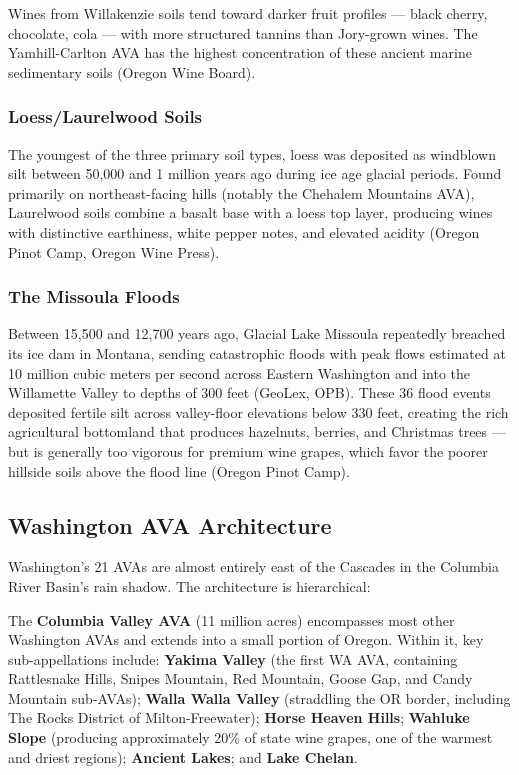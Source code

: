 \documentclass[11pt,letterpaper]{article}
\begin{document}
Wines from Willakenzie soils tend toward darker fruit profiles --- black cherry, chocolate, cola --- with more structured tannins than Jory-grown wines. The Yamhill-Carlton AVA has the highest concentration of these ancient marine sedimentary soils (Oregon Wine Board).

\subsubsection{Loess/Laurelwood Soils}

The youngest of the three primary soil types, loess was deposited as windblown silt between 50,000 and 1 million years ago during ice age glacial periods. Found primarily on northeast-facing hills (notably the Chehalem Mountains AVA), Laurelwood soils combine a basalt base with a loess top layer, producing wines with distinctive earthiness, white pepper notes, and elevated acidity (Oregon Pinot Camp, Oregon Wine Press).

\subsubsection{The Missoula Floods}

Between 15,500 and 12,700 years ago, Glacial Lake Missoula repeatedly breached its ice dam in Montana, sending catastrophic floods with peak flows estimated at 10 million cubic meters per second across Eastern Washington and into the Willamette Valley to depths of 300 feet (GeoLex, OPB). These 36 flood events deposited fertile silt across valley-floor elevations below 330 feet, creating the rich agricultural bottomland that produces hazelnuts, berries, and Christmas trees --- but is generally too vigorous for premium wine grapes, which favor the poorer hillside soils above the flood line (Oregon Pinot Camp).

\subsection{Washington AVA Architecture}

Washington's 21 AVAs are almost entirely east of the Cascades in the Columbia River Basin's rain shadow. The architecture is hierarchical:

The \textbf{Columbia Valley AVA} (11 million acres) encompasses most other Washington AVAs and extends into a small portion of Oregon. Within it, key sub-appellations include: \textbf{Yakima Valley} (the first WA AVA, containing Rattlesnake Hills, Snipes Mountain, Red Mountain, Goose Gap, and Candy Mountain sub-AVAs); \textbf{Walla Walla Valley} (straddling the OR border, including The Rocks District of Milton-Freewater); \textbf{Horse Heaven Hills}; \textbf{Wahluke Slope} (producing approximately 20\% of state wine grapes, one of the warmest and driest regions); \textbf{Ancient Lakes}; and \textbf{Lake Chelan}.
\end{document}
